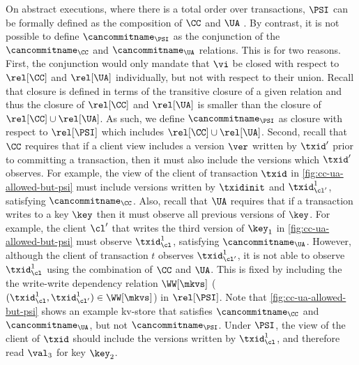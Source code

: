 On abstract executions, where there is a total order over transactions,  
\(\PSI\) can be formally defined as the composition of
 \(\CC\) and \(\UA\) \cite{framework-concur}. By contrast, it is not possible to define \(\cancommitname_{\PSI}\) as
the conjunction of the \(\cancommitname_{\CC}\) and
\(\cancommitname_{\UA}\) relations. 
This is for two reasons. 
First, the conjunction would only mandate that \(\vi\) be closed with respect to 
\(\rel[\CC]\) and \(\rel[\UA]\) {individually}, but {not} with respect to their {union}.
Recall that closure is defined in terms of the transitive closure of a given relation 
and thus the closure of \(\rel[\CC]\) and \(\rel[\UA]\) is smaller than the closure of \(\rel[\CC] \cup \rel[\UA]\).
As such, we define \(\cancommitname_{\PSI}\) as closure with respect to \(\rel[\PSI] \) which includes \( \rel[\CC] \cup \rel[\UA]\).
Second, recall that \(\CC\) requires that
if a client view includes 
a version \(\ver\) written by \( \txid' \) prior to committing a transaction, 
then it must also include the versions which \(\txid'\) observes.
For example, the  view of the client of transaction \( \txid \) in \cref{fig:cc-ua-allowed-but-psi}
must include versions written by \( \txidinit\) and \( \txid^{1}_{\cl'} \),
satisfying  \(\cancommitname_{\CC}\).
Also, recall that \(\UA\) requires that if  a transaction writes
to a key \(\key\) then it must  observe all previous versions of \(\key\).
For example, the client $\cl'$ 
that writes the third
version of \( \key_1 \) in \cref{fig:cc-ua-allowed-but-psi} must
observe \( \txid^{1}_{\cl} \), satisfying  \(\cancommitname_{\UA}\).
However,  although the client of  transaction $t$ observes \( \txid^{1}_{\cl'} \),
it is not able to observe \( \txid^{1}_{\cl} \) using the combination
of \(\CC\) and \(\UA\). 
This is fixed by including the 
the write-write dependency relation \(\WW[\mkvs]\) (\eg \(
(\txid^{1}_{\cl}, \txid^{1}_{\cl'} ) \in \WW[\mkvs] \)) in 
\(\rel[\PSI]\).
Note that \cref{fig:cc-ua-allowed-but-psi} 
shows an example kv-store that satisfies 
 \(\cancommitname_{\CC} \) and \( \cancommitname_{\UA}\), 
but not \(\cancommitname_{\PSI}\). 
Under \( \PSI \), the  view of the client of \( \txid \) should include the versions written by \( \txid^{1}_{\cl} \),
and therefore read \( \val_3 \) for key \( \key_2 \).



